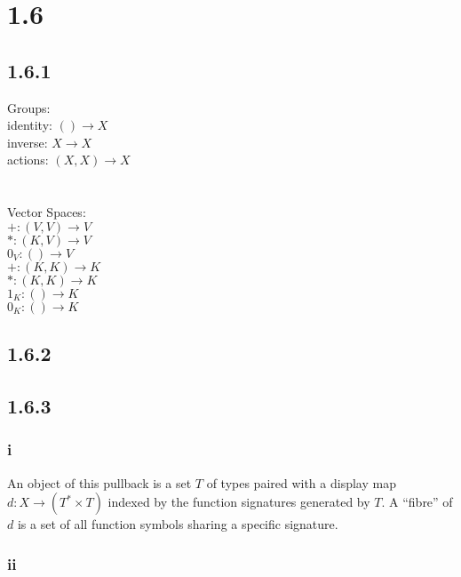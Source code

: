 \documentclass{article}
\begin{document}
%

\section*{1.6}

\subsection*{1.6.1}

Groups:\\
identity: $() \to X$\\
inverse: $X \to X$\\
actions: $(X,X) \to X$\\
\\~\\
Vector Spaces:\\
$+ : (V,V) \to V$\\
$* : (K,V) \to V$\\
$0_V : () \to V$\\
$+ : (K,K) \to K$\\
$* : (K,K) \to K$\\
$1_K : () \to K$\\
$0_K : () \to K$

\subsection*{1.6.2}


\subsection*{1.6.3}

\subsubsection*{i}

An object of this pullback is a set $T$ of types paired with a display map $d : X \to (T^* \times T)$
indexed by the function signatures generated by $T$. A ``fibre'' of $d$ is a set of all function symbols
sharing a specific signature.

\subsubsection*{ii}
\end{document}
